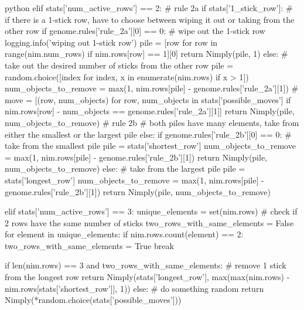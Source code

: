 \begin{mintedbox}{python}
            elif stats['num_active_rows'] == 2:
                # rule 2a
                if stats['1_stick_row']:
                    # if there is a 1-stick row, have to choose between wiping it out or taking from the other row
                    if genome.rules['rule_2a'][0] == 0:
                        # wipe out the 1-stick row
                        logging.info('wiping out 1-stick row')
                        pile = [row for row in range(nim.num_rows) if nim.rows[row] == 1][0]
                        return Nimply(pile, 1)
                    else:
                        # take out the desired number of sticks from the other row
                        pile = random.choice([index for index, x in enumerate(nim.rows) if x > 1])
                        num_objects_to_remove = max(1, nim.rows[pile] - genome.rules['rule_2a'][1])
                        # move = [(row, num_objects) for row, num_objects in stats['possible_moves'] if nim.rows[row] - num_objects == genome.rules['rule_2a'][1]]
                        return Nimply(pile, num_objects_to_remove)
                # rule 2b
                # both piles have many elements, take from either the smallest or the largest pile
                else:
                    if genome.rules['rule_2b'][0] == 0:
                        # take from the smallest pile
                        pile = stats['shortest_row']
                        num_objects_to_remove = max(1, nim.rows[pile] - genome.rules['rule_2b'][1])
                        return Nimply(pile, num_objects_to_remove)
                    else:
                        # take from the largest pile
                        pile = stats['longest_row']
                        num_objects_to_remove = max(1, nim.rows[pile] - genome.rules['rule_2b'][1])
                        return Nimply(pile, num_objects_to_remove)

            elif stats['num_active_rows'] == 3:
                unique_elements = set(nim.rows)
                # check if 2 rows have the same number of sticks
                two_rows_with_same_elements = False
                for element in unique_elements:
                    if nim.rows.count(element) == 2:
                        two_rows_with_same_elements = True
                        break

                if len(nim.rows) == 3 and two_rows_with_same_elements:
                    # remove 1 stick from the longest row
                    return Nimply(stats['longest_row'], max(max(nim.rows) - nim.rows[stats['shortest_row']], 1))
                else:
                    # do something random
                    return Nimply(*random.choice(stats['possible_moves']))


\end{mintedbox}
